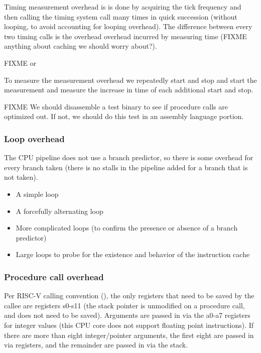 \documentclass{article}
\begin{document}
Timing measurement overhead is is done by acquiring the tick frequency and then calling the timing system call many times in quick succession (without looping, to avoid accounting for looping overhead). The difference between every two timing calls is the overhead overhead incurred by measuring time (FIXME anything about caching we should worry about?).

FIXME or

To measure the measurement overhead we repeatedly start and stop and start the measurement and measure the increase in time of each additional start and stop.

FIXME We should disassemble a test binary to see if procedure calls are optimized out. If not, we should do this test in an assembly language portion.

\subsubsection{Loop overhead}

The CPU pipeline does not use a branch predictor, so there is some overhead for every branch taken (there is no stalls in the pipeline added for a branch that is not taken).
\begin{itemize}
    \item A simple loop
    \item A forcefully alternating loop
    \item More complicated loops (to confirm the presence or absence of a branch predictor)
    \item Large loops to probe for the existence and behavior of the instruction cache
\end{itemize}
    
\subsubsection{Procedure call overhead}

Per RISC-V calling convention (), the only registers that need to be saved by the callee are registers s0-s11 (the stack pointer is unmodified on a procedure call, and does not need to be saved). Arguments are passed in via the a0-a7 registers for integer values (this CPU core does not support floating point instructions). If there are more than eight integer/pointer arguments, the first eight are passed in via registers, and the remainder are passed in via the stack.
\end{document}

